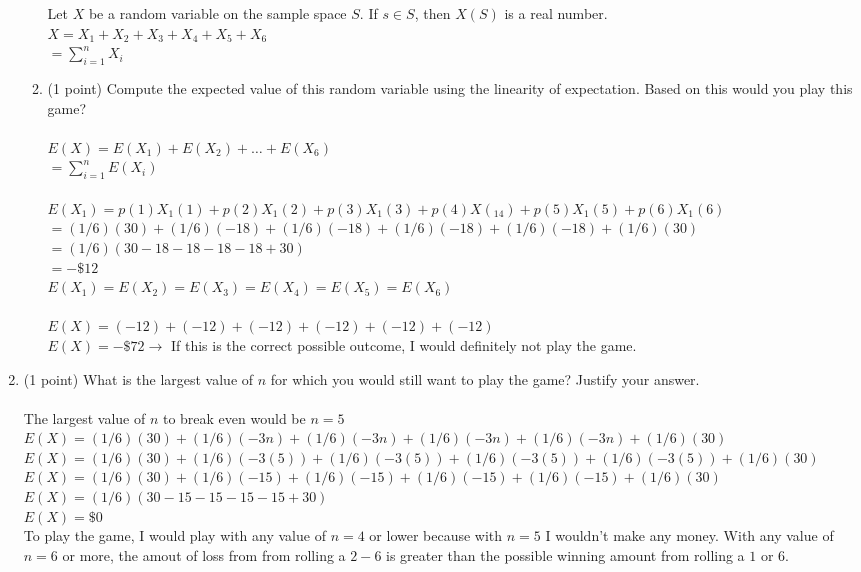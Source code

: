 \documentclass[12pt]{elsart}
\begin{document}
\begin{enumerate}
\begin{enumerate}
		Let $X$ be a random variable on the sample space $S$. If $s\in S$, then $X(S)$ is a real number.\\
		$X=X_1+X_2+X_3+X_4+X_5+X_6$\\
		$\boxed{= \sum\limits_{i=1}^{n} X_i}$\\
 	  \item  (1 point) Compute the expected value of this random variable using the linearity of expectation.  Based on this would you play this game?\\\\
		$E(X)=E(X_1)+E(X_2)+\ldots+E(X_6)$\\
		$=\sum\limits_{i=1}^{n}E(X_i)$\\\\
		$E(X_1)=p(1)X_1(1)+p(2)X_1(2)+p(3)X_1(3)+p(4)X(_14)+p(5)X_1(5)+p(6)X_1(6)$\\
		$=(1/6)(30)+(1/6)(-18)+(1/6)(-18)+(1/6)(-18)+(1/6)(-18)+(1/6)(30)$\\
		$=(1/6)(30-18-18-18-18+30)$\\
		$=-\$12$\\
		$E(X_1)=E(X_2)=E(X_3)=E(X_4)=E(X_5)=E(X_6)$\\\\
		$E(X)=(-12)+(-12)+(-12)+(-12)+(-12)+(-12)$\\
		$\boxed{E(X)=-\$72}\rightarrow$ If this is the correct possible outcome, I would definitely not play the game.\\
		
\end{enumerate}
\newpage
   \item  (1 point) What is the largest value of $n$ for which you would still want to play the game?  Justify your answer.\\\\
	The largest value of $n$ to break even would be $n=5$\\
	$E(X)=(1/6)(30)+(1/6)(-3n)+(1/6)(-3n)+(1/6)(-3n)+(1/6)(-3n)+(1/6)(30)$\\
	$E(X)=(1/6)(30)+(1/6)(-3(5))+(1/6)(-3(5))+(1/6)(-3(5))+(1/6)(-3(5))+(1/6)(30)$\\
	$E(X)=(1/6)(30)+(1/6)(-15)+(1/6)(-15)+(1/6)(-15)+(1/6)(-15)+(1/6)(30)$\\
	$E(X)=(1/6)(30-15-15-15-15+30)$\\
	$E(X)=\$0$\\
	To play the game, I would play with any value of $n=4$ or lower because with $n=5$ I wouldn't make any money. With any value of $n=6$ or more, the amout of loss from from rolling a $2-6$ is greater than the possible winning amount from rolling a $1$ or $6$.\\
	
\end{enumerate}
\end{document}
